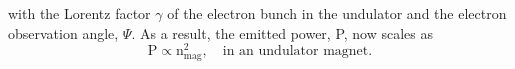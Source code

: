 with the Lorentz factor $\gamma$ of the electron bunch in the undulator and the electron observation angle, $\Psi$. As a result, the emitted power, P, now scales as \citep{Kim-1986-NIMPRA}
\begin{equation}
\text{P} \propto \text{n}_{\text{mag}}^{2},\quad \text{in an undulator magnet.}
\end{equation}
%
%
%
